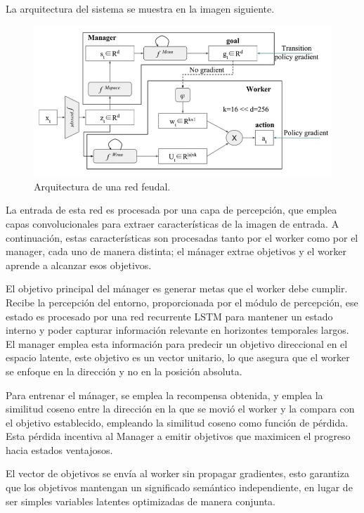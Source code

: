 \documentclass[letterpaper]{article} %
\begin{document}
La arquitectura del sistema se muestra en la imagen siguiente\cite{feudal_networks_2024}.

\begin{figure}[H]
    \centering
    \includegraphics[width=0.9\columnwidth]{feudal_arquitecture.png}
    \caption{Arquitectura de una red feudal.\label{fig:arquitectura_feudal}}
\end{figure}

La entrada de esta red es procesada por una capa de percepción, que emplea capas convolucionales
para extraer características de la imagen de entrada. A continuación, estas características son procesadas
tanto por el worker como por el manager, cada uno de manera distinta; el mánager extrae objetivos y el worker
aprende a alcanzar esos objetivos.

El objetivo principal del mánager es generar metas que el worker debe cumplir. Recibe la percepción
del entorno, proporcionada por el módulo de percepción, ese estado es procesado por una red recurrente LSTM
para mantener un estado interno y poder capturar información relevante en horizontes temporales largos.
El manager emplea esta información para predecir un objetivo direccional en el espacio latente, este objetivo
es un vector unitario, lo que asegura que el worker se enfoque en la dirección y no en la posición absoluta.

Para entrenar el mánager, se emplea la recompensa obtenida, y emplea la similitud coseno entre la dirección en la que 
se movió el worker y la compara con el objetivo establecido, empleando la similitud coseno como función de pérdida.
Esta pérdida incentiva al Manager a emitir objetivos que maximicen el progreso hacia estados ventajosos.

El vector de objetivos se envía al worker sin propagar gradientes, esto garantiza que los objetivos 
mantengan un significado semántico independiente, en lugar de ser simples variables latentes optimizadas de manera conjunta.
\end{document}

